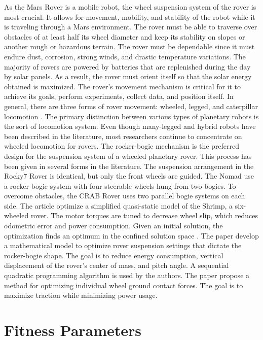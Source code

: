 \documentclass[default,iicol]{sn-jnl}
\theoremstyle{thmstyleone}
\theoremstyle{thmstyletwo}
\theoremstyle{thmstylethree}
\begin{document}
As the Mars Rover is a mobile robot, the wheel suspension system of the rover is most crucial. It allows for movement, mobility, and stability of the robot while it is traveling through a Mars environment. The rover must be able to traverse over obstacles of at least half its wheel diameter and keep its stability on slopes or another rough or hazardous terrain. The rover must be dependable since it must endure dust, corrosion, strong winds, and drastic temperature variations. The majority of rovers are powered by batteries that are replenished during the day by solar panels. As a result, the rover must orient itself so that the solar energy obtained is maximized. The rover’s movement mechanism is critical for it to achieve its goals, perform experiments, collect data, and position itself. In general, there are three forms of rover movement: wheeled, legged, and caterpillar locomotion  \cite{bib31} \cite{bib32}. The primary distinction between various types of planetary robots is the sort of locomotion system. Even though many-legged and hybrid robots have been described in the literature, most researchers continue to concentrate on wheeled locomotion for rovers. The rocker-bogie mechanism is the preferred design for the suspension system of a wheeled planetary rover. This process has been given in several forms in the literature. The suspension arrangement in the Rocky7 Rover \cite{bib33} is identical, but only the front wheels are guided. The Nomad \cite{bib34} use a rocker-bogie system with four steerable wheels hung from two bogies. To overcome obstacles, the CRAB Rover \cite{bib35} uses two parallel bogie systems on each side. The article \cite{bib7} optimize a simplified quasi-static model of the Shrimp, a six-wheeled rover. The motor torques are tuned to decrease wheel slip, which reduces odometric error and power consumption. Given an initial solution, the optimization finds an optimum in the confined solution space \cite{bib23}. The paper \cite{bib14} develop a mathematical model to optimize rover suspension settings that dictate the rocker-bogie shape. The goal is to reduce energy consumption, vertical displacement of the rover’s center of mass, and pitch angle. A sequential quadratic programming algorithm is used by the authors. The paper \cite{bib7} propose a method for optimizing individual wheel ground contact forces. The goal is to maximize traction while minimizing power usage.

\section{Fitness Parameters}\label{sec2}
\end{document}
